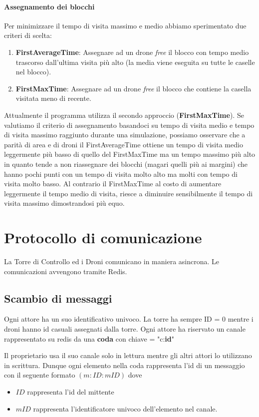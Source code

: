 \documentclass[a4paper, 11pt]{article}
\begin{document}
\paragraph*{Assegnamento dei blocchi}
Per minimizzare il tempo di visita massimo e medio abbiamo sperimentato due criteri di scelta:
\begin{enumerate}
    \item \textbf{FirstAverageTime}: Assegnare ad un drone \textit{free} il blocco con tempo medio trascorso dall'ultima visita più alto (la media viene eseguita su tutte le caselle nel blocco).
    
    \item \textbf{FirstMaxTime}: Assegnare ad un drone \textit{free} il blocco che contiene la casella visitata meno di recente.
\end{enumerate}
Attualmente il programma utilizza il secondo approccio (\textbf{FirstMaxTime}). Se valutiamo il criterio di assegnamento basandoci su tempo di visita medio e tempo di visita massimo raggiunto durante una simulazione, 
possiamo osservare che a parità di area e di droni il FirstAverageTime ottiene un tempo di visita medio leggermente più basso di quello del FirstMaxTime ma un tempo massimo più alto in quanto tende a non riassegnare dei blocchi (magari quelli più ai margini) che hanno pochi punti con un tempo di visita molto alto ma molti con tempo di visita molto basso.
Al contrario il FirstMaxTime al costo di aumentare leggermente il tempo medio di visita, riesce a diminuire sensibilmente il tempo di visita massimo dimostrandosi più equo.  


\section{Protocollo di comunicazione}
La Torre di Controllo ed i Droni comunicano in maniera asincrona. Le comunicazioni avvengono tramite Redis.
\subsection{Scambio di messaggi}

Ogni attore ha un suo identificativo univoco. La torre ha sempre ID = 0 mentre i droni hanno id casuali assegnati dalla torre. 
Ogni attore ha riservato un canale rappresentato su redis da una \textbf{coda} con chiave = "c:\textbf{id}"

Il proprietario usa il suo canale solo in lettura mentre gli altri attori lo utilizzano in scrittura.
Dunque ogni elemento nella coda rappresenta l'id di un messaggio con il seguente formato $(m:ID:mID)$ dove
\begin{itemize}
    \item $ID$ rappresenta l'id del mittente
    \item $mID$ rappresenta l'identificatore univoco dell'elemento nel canale.
\end{itemize}
\end{document}

